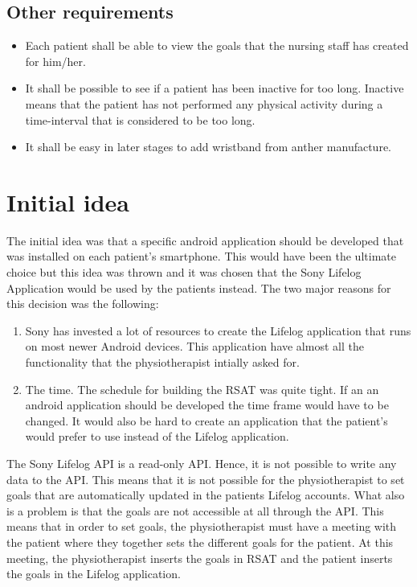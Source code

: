 \documentclass{cslthse-msc}
\begin{document}
\subsection{Other requirements}
\begin{itemize}
    \item Each patient shall be able to view the goals that the nursing staff has created for him/her.
    \item It shall be possible to see if a patient has been inactive for too long. Inactive means that the patient has not performed any physical activity during a time-interval that is considered to be too long.
    \item It shall be easy in later stages to add wristband from anther manufacture. 
\end{itemize}

\section{Initial idea}
The initial idea was that a specific android application should be developed that was installed on each patient's smartphone. This would have been the ultimate choice but this idea was thrown and it was chosen that the Sony Lifelog Application would be used by the patients instead. The two major reasons for this decision was the following: 

\begin{enumerate}
    \item Sony has invested a lot of resources to create the Lifelog application that runs on most newer Android devices. This application have almost all the functionality that the physiotherapist intially asked for.
    \item The time. The schedule for building the RSAT was quite tight. If an an android application should be developed the time frame would have to be changed. It would also be hard to create an application that the patient's would prefer to use instead of the Lifelog application.
\end{enumerate}

The Sony Lifelog API is a read-only API. Hence, it is not possible to write any data to the API. This means that it is not possible for the physiotherapist to set goals that are automatically updated in the patients Lifelog accounts. What also is a problem is that the goals are not accessible at all through the API. This means that in order to set goals, the physiotherapist must have a meeting with the patient where they together sets the different goals for the patient. At this meeting, the physiotherapist inserts the goals in RSAT and the patient inserts the goals in the Lifelog application. 
\end{document}
